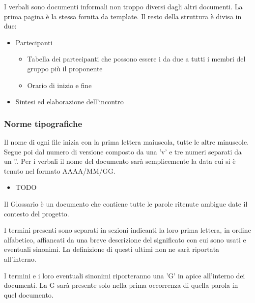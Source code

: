 
        I verbali sono documenti informali non troppo diversi dagli altri documenti.
        La prima pagina è la stessa fornita da template.
        Il resto della struttura è divisa in due:
        \begin{itemize}
          \item Partecipanti
          \begin{itemize}
            \item Tabella dei partecipanti che possono essere i da due a tutti i membri del gruppo più il proponente
            \item Orario di inizio e fine
          \end{itemize}
          \item Sintesi ed elaborazione dell'incontro
        \end{itemize}

\subsubsection{Norme tipografiche}

    Il nome di ogni file inizia con la prima lettera maiuscola, tutte le altre minuscole.
    Segue poi dal numero di versione composto da una 'v' e tre numeri separati da un '.'.
    Per i verbali il nome del documento sarà semplicemente la data cui si è tenuto nel formato
    AAAA/MM/GG.

    \begin{itemize}
    \item TODO
    \end{itemize}

    Il Glossario è un documento che contiene tutte le parole ritenute ambigue date il contesto del progetto.

    I termini presenti sono separati in sezioni indicanti la loro prima lettera, in ordine alfabetico, affiancati
    da una breve descrizione del significato con cui sono usati e eventuali sinonimi.
    La definizione di questi ultimi non ne sarà riportata all'interno.

    I termini e i loro eventuali sinonimi riporteranno una 'G' in apice all'interno dei documenti. La G sarà
    presente solo nella prima occorrenza di quella parola in quel documento.

